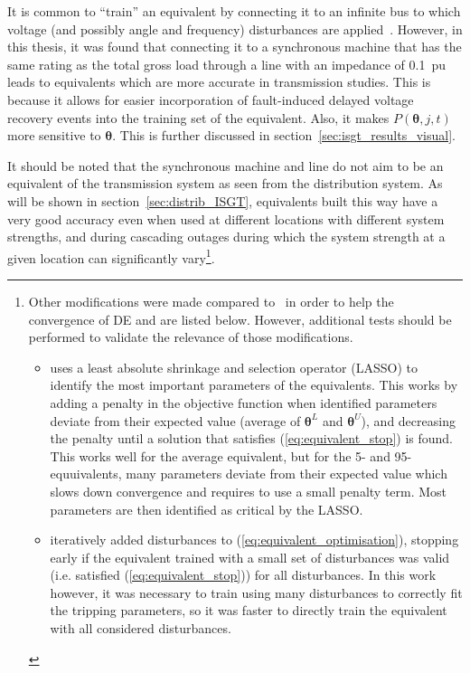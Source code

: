 

It is common to ``train'' an equivalent by connecting it to an infinite bus to which voltage (and possibly angle and frequency) disturbances are applied~\cite{ChaspierreThesis, CIGREloadModels, fulgencio}. However, in this thesis, it was found that connecting it to a synchronous machine that has the same rating as the total gross load through a line with an impedance of 0.1~pu leads to equivalents which are more accurate in transmission studies. This is because it allows for easier incorporation of fault-induced delayed voltage recovery events into the training set of the equivalent. Also, it makes \(P(\bm{\theta}, j, t)\) more sensitive to \(\bm{\theta}\). This is further discussed in section~\ref{sec:isgt_results_visual}.

It should be noted that the synchronous machine and line do not aim to be an equivalent of the transmission system as seen from the distribution system. As will be shown in section~\ref{sec:distrib_ISGT}, equivalents built this way have a very good accuracy even when used at different locations with different system strengths, and during cascading outages during which the system strength at a given location can significantly vary\footnote{Other modifications were made compared to~\cite{ChaspierreThesis} in order to help the convergence of DE and are listed below. However, additional tests should be performed to validate the relevance of those modifications.
\begin{itemize}
    \item \cite{ChaspierreThesis} uses a least absolute shrinkage and selection operator (LASSO) to identify the most important parameters of the equivalents. This works by adding a penalty in the objective function when identified parameters deviate from their expected value (average of \(\bm{\theta}^L\) and \(\bm{\theta}^U\)), and decreasing the penalty until a solution that satisfies (\ref{eq:equivalent_stop}) is found. This works well for the average equivalent, but for the 5- and 95-equuivalents, many parameters deviate from their expected value which slows down convergence and requires to use a small penalty term. Most parameters are then identified as critical by the LASSO.
    \item \cite{ChaspierreThesis} iteratively added disturbances to (\ref{eq:equivalent_optimisation}), stopping early if the equivalent trained with a small set of disturbances was valid (i.e. satisfied (\ref{eq:equivalent_stop})) for all disturbances. In this work however, it was necessary to train using many disturbances to correctly fit the tripping parameters, so it was faster to directly train the equivalent with all considered disturbances.
\end{itemize}
}.


